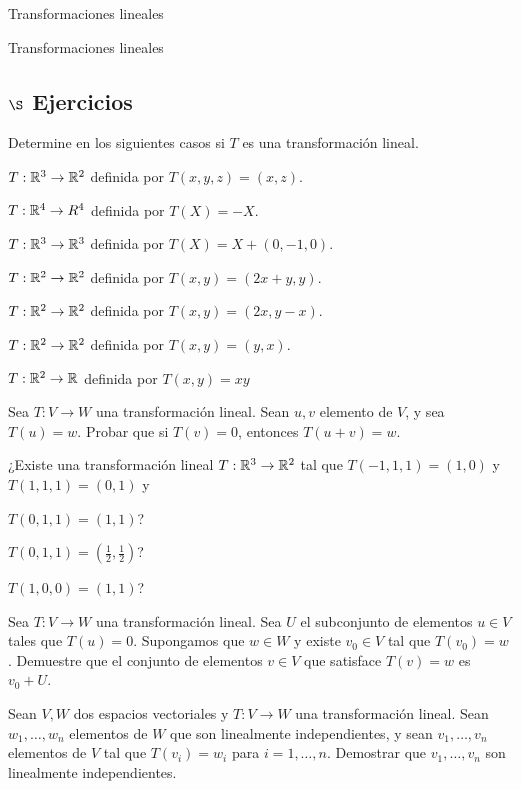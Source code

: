 \begin{chapter}{Transformaciones lineales}
\begin{section}{Transformaciones lineales}
        \subsection*{$\S$ Ejercicios}
        \begin{enumex}
            \item Determine en los siguientes casos si $T$  es una transformación lineal.
            \begin{enumex}
                \item $T: \mathbb R^3 \to \mathbb R^2$ definida por $T(x, y, z) = (x, z)$.
                \item $T: \mathbb R^4 \to R^4$ definida por $T(X) = -X$.
                \item $T: \mathbb R^3  \to \mathbb R^3$ definida por $T(X) = X + (0, -1, 0)$.
                \item $T: \mathbb R^2  \to \mathbb R^2$ definida por $T(x, y) = (2x + y, y)$.
                \item $T: \mathbb R^2  \to \mathbb R^2$ definida por $T(x, y) = (2x, y - x)$.
                \item $T: \mathbb R^2  \to \mathbb R^2$ definida por $T(x, y) = (y, x)$.
                \item $T: \mathbb R^2 \to \mathbb R$ definida por $T(x, y) = xy$
            \end{enumex}
            \item Sea $T: V \to W$ una transformación lineal. Sean $u,v$ elemento de $V$, y sea  $T(u)=w$. Probar que si $T(v) =0$, entonces $T(u+v)=w$.
            
            \item ¿Existe una transformación lineal $T: \mathbb R^3 \to \mathbb R^2$ tal que $T(-1,1,1) = (1,0)$ y $T(1,1,1) = (0,1)$ y 
                \begin{enumex}
                    \item $T(0,1,1) = (1,1)$?
                    \item $T(0,1,1) = (\frac12,\frac12)$?
                    \item $T(1,0,0) = (1,1)$?
                \end{enumex} 
            
            \item  Sea $T: V \to W$ una transformación lineal. Sea $U$ el subconjunto de elementos $u \in V$ tales que $T (u) = 0$. Supongamos que $w \in W$ y existe $v_0\in  V$ tal que $T (v_0) = w$. Demuestre que el conjunto de elementos $v \in V$ que satisface $T (v) = w$ es $v_0+ U$.
            
            \item Sean $V, W$ dos espacios vectoriales y $T: V \to W$ una transformación lineal. Sean $w_1,\ldots,w_n$ elementos de $W$ que son linealmente independientes, y sean $v_1,\ldots, v_n$ elementos de $V$ tal que $T(v_i) = w_i$ para $i = 1, \ldots, n$. Demostrar que $v_1,\ldots, v_n$ son linealmente independientes.
            

\end{enumex}
\end{section}
\end{chapter}
